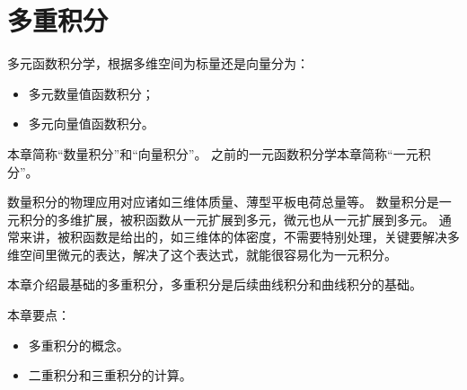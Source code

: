 \chapter{多重积分}

多元函数积分学，根据多维空间为标量还是向量分为：
\begin{itemize}
    \item 多元数量值函数积分；
    \item 多元向量值函数积分。
\end{itemize}
本章简称“数量积分”和“向量积分”。
之前的一元函数积分学本章简称“一元积分”。

数量积分的物理应用对应诸如三维体质量、薄型平板电荷总量等。
数量积分是一元积分的多维扩展，被积函数从一元扩展到多元，微元也从一元扩展到多元。
通常来讲，被积函数是给出的，如三维体的体密度，不需要特别处理，关键要解决多维空间里微元的表达，解决了这个表达式，就能很容易化为一元积分。

本章介绍最基础的多重积分，多重积分是后续曲线积分和曲线积分的基础。

本章要点：
\begin{itemize}
    \item 多重积分的概念。
    \item 二重积分和三重积分的计算。
\end{itemize}

~

\newpage


\newpage


\newpage


\newpage


\newpage





